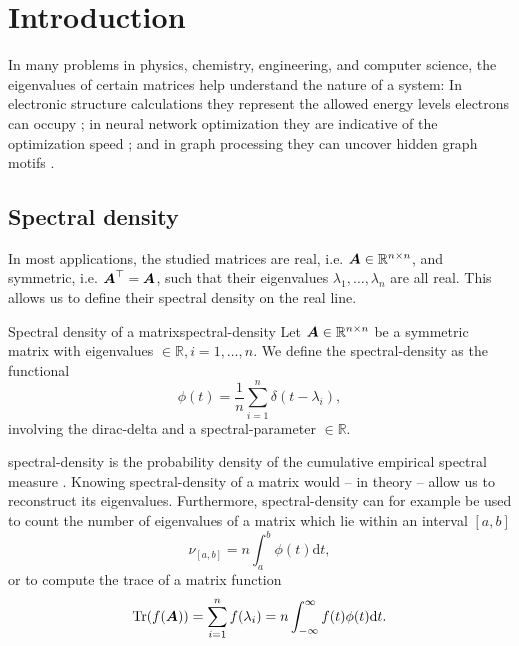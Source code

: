 \chapter{Introduction}
\label{chp:1-introduction}

In many problems in physics, chemistry, engineering, and computer science, 
the eigenvalues of certain matrices help understand the nature of a system:
In electronic structure calculations they represent the allowed energy levels 
electrons can occupy \cite{ducastelle1970charge, haydock1972electronic, lin2017randomized};
in neural network optimization they are indicative of the optimization speed \cite{ghorbani2019investigation,chen2021slq,adepu2021hessian};
and in graph processing they can uncover hidden graph motifs \cite{kruzick2018graph,huang2021kernels,patane2022filter}.\\

\section{Spectral density}
\label{sec:1-introduction-spectral-density}

In most applications, the studied matrices are real,
i.e. $\boldsymbol{A} \in \mathbb{R}^{n \times n}$, and symmetric, i.e. $\boldsymbol{A}^{\top} = \boldsymbol{A}$,
such that their eigenvalues $\lambda_1, \dots, \lambda_n$ are all real.
This allows us to define their spectral density on the real line.
\begin{definition}{Spectral density of a matrix}{spectral-density}
    Let $\boldsymbol{A} \in \mathbb{R}^{n \times n}$ be a symmetric matrix with \glspl{eigenvalue}
    $\in \mathbb{R}, i=1, \dots, n$. We define the \gls{spectral-density} as
    the functional
    \begin{equation}
        \phi(t) = \frac{1}{n} \sum_{i=1}^{n} \delta(t - \lambda_i),
        \label{equ:1-introduction-def-spectral-density}
    \end{equation}
    involving the \gls{dirac-delta}
    and a \gls{spectral-parameter} $\in \mathbb{R}$.
\end{definition}

\gls{spectral-density} is the probability density \cite{klenke2013probability}
of the cumulative empirical spectral measure \cite{chen2021slq}. Knowing \gls{spectral-density}
of a matrix would -- in theory -- allow us to reconstruct its eigenvalues.
Furthermore, \gls{spectral-density} can for example be used to count
the number of eigenvalues of a matrix which lie within an interval $[a, b]$
\begin{equation}
    \nu_{[a, b]} = n \int_{a}^{b} \phi(t) \mathrm{d}t,
    \label{equ:1-introduction-eigenvalue-counting}
\end{equation}
or to compute the trace of a matrix function \cite{lin2017randomized}
\begin{equation}
    \operatorname{Tr}(f(\boldsymbol{A})) = \sum_{i=1}^n f(\lambda_i) = n \int_{-\infty}^{\infty} f(t) \phi(t) \mathrm{d}t.
    \label{equ:1-introduction-matrix-trace}
\end{equation}\\

